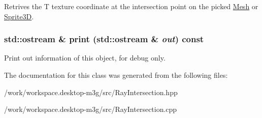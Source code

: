 Retrives the T texture coordinate at the intersection point on the picked \hyperlink{classm3g_1_1Mesh}{Mesh} or \hyperlink{classm3g_1_1Sprite3D}{Sprite3D}. \hypertarget{classm3g_1_1RayIntersection_6fea17fa1532df3794f8cb39cb4f911f}{
\subsubsection[{print}]{\setlength{\rightskip}{0pt plus 5cm}std::ostream \& print (std::ostream \& {\em out}) const}}
\label{classm3g_1_1RayIntersection_6fea17fa1532df3794f8cb39cb4f911f}


Print out information of this object, for debug only. 

The documentation for this class was generated from the following files:\begin{CompactItemize}
\item 
/work/workspace.desktop-m3g/src/RayIntersection.hpp\item 
/work/workspace.desktop-m3g/src/RayIntersection.cpp\end{CompactItemize}
